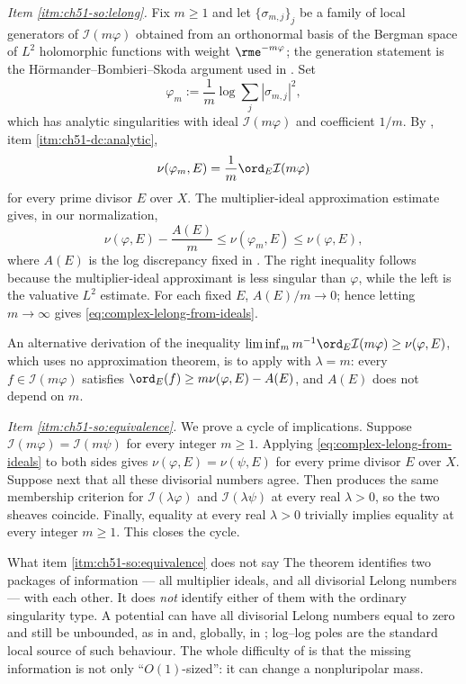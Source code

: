 \emph{Item \cref{itm:ch51-so:lelong}.}  Fix $m\geq1$ and let
$\{\sigma_{m,j}\}_j$ be a family of local generators of
$\mathcal I(m\varphi)$ obtained from an orthonormal basis of the
Bergman space of $L^2$ holomorphic functions with weight
$\rme^{-m\varphi}$; the generation statement is the
H\"ormander--Bombieri--Skoda argument used in \cite{Dem92reg}.  Set
\[
 \varphi_m:=\frac1m\log\sum_j|\sigma_{m,j}|^2 ,
\]
which has analytic singularities with ideal $\mathcal I(m\varphi)$ and
coefficient $1/m$.  By , item
\cref{itm:ch51-dc:analytic},
\[
 \nu(\varphi_m,E)=\frac1m\ord_E\mathcal I(m\varphi)
\]
for every prime divisor $E$ over $X$.  The multiplier-ideal
approximation estimate \cite[proof of Corollary~10.18]{Bou17} gives, in our
normalization,
\[
 \nu(\varphi,E)-\frac{A(E)}m
 \leq\nu(\varphi_m,E)\leq\nu(\varphi,E),
\]
where $A(E)$ is the log discrepancy fixed in
.  The right inequality follows because
the multiplier-ideal approximant is less singular than $\varphi$, while
the left is the valuative $L^2$ estimate.  For each fixed $E$,
$A(E)/m\to0$; hence letting $m\to\infty$ gives
\eqref{eq:complex-lelong-from-ideals}.

An alternative derivation of the inequality
$\liminf_m m^{-1}\ord_E\mathcal I(m\varphi)\geq\nu(\varphi,E)$, which
uses no approximation theorem, is to apply
 with $\lambda=m$: every
$f\in\mathcal I(m\varphi)$ satisfies
$\ord_E(f)\geq m\nu(\varphi,E)-A(E)$, and $A(E)$ does not depend on
$m$.

\emph{Item \cref{itm:ch51-so:equivalence}.}  We prove a cycle of
implications.  Suppose $\mathcal I(m\varphi)=\mathcal I(m\psi)$ for
every integer $m\geq1$.  Applying
\eqref{eq:complex-lelong-from-ideals} to both sides gives
$\nu(\varphi,E)=\nu(\psi,E)$ for every prime divisor $E$ over $X$.
Suppose next that all these divisorial numbers agree.  Then
 produces the same membership
criterion for $\mathcal I(\lambda\varphi)$ and
$\mathcal I(\lambda\psi)$ at every real $\lambda>0$, so the two
sheaves coincide.  Finally, equality at every real $\lambda>0$
trivially implies equality at every integer $m\geq1$.  This closes the
cycle.

\begin{warning}{What item \cref{itm:ch51-so:equivalence} does not say}
\label{warn:ch51-so-scope}
The theorem identifies two packages of information --- all multiplier
ideals, and all divisorial Lelong numbers --- with each other.  It does
\emph{not} identify either of them with the ordinary singularity type.  A
potential can have all divisorial Lelong numbers equal to zero and still
be unbounded, as in  and, globally, in
; log--log poles are the standard local source of
such behaviour.  The whole difficulty of  is that
the missing information is not only ``$O(1)$-sized'': it can change a
nonpluripolar mass.
\end{warning}

